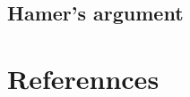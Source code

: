 \documentclass[
  10pt,
  dvipsnames,enabledeprecatedfontcommands]{scrartcl}
\begin{document}
\hypertarget{hamers-argument}{%
\subsection{Hamer's argument}\label{hamers-argument}}

\hypertarget{referennces}{%
\section{Referennces}\label{referennces}}
\end{document}
